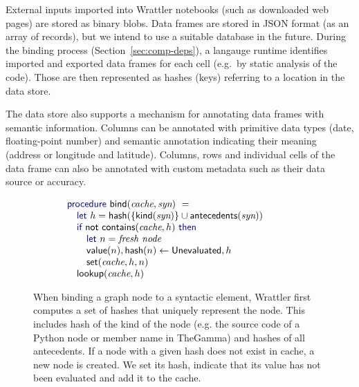 \documentclass[sigplan]{acmart}\settopmatter{printfolios=true,printccs=false,printacmref=false}
\begin{document}
External inputs imported into Wrattler notebooks (such as downloaded web pages) are stored as 
binary blobs. Data frames are stored in JSON format (as an array of records),
but we intend to use a suitable database in the future. During the binding process 
(Section~\ref{sec:comp-deps}), a langauge runtime identifies imported and exported data frames 
for each cell (e.g.~by static analysis of the code). Those are then represented as hashes (keys)
referring to a location in the data store.

The data store also supports a mechanism for annotating data frames with 
semantic information. Columns can be annotated with primitive data types (date, floating-point 
number) and semantic annotation indicating their meaning (address or longitude and latitude). 
Columns, rows and individual cells of the data frame can also be annotated with custom metadata 
such as their data source or accuracy.

\begin{figure}
\vspace{-1em}
\begin{equation*}
\hspace{-3em}\begin{array}{l}
\kvd{procedure}~\ident{bind}(\textit{cache}, \textit{syn})~=\\
\quad \kvd{let}~h = \ident{hash}(\{\ident{kind}(\textit{syn}) \}\cup \ident{antecedents}(\textit{syn}))\\
\quad \kvd{if}~\ident{not}~\ident{contains}(\textit{cache}, h)~\kvd{then}\\
\quad \quad \kvd{let}~n = \emph{fresh node}\\
\quad \quad \ident{value}(n), \ident{hash}(n) \leftarrow \ident{Unevaluated}, h \\
\quad \quad \ident{set}(\textit{cache}, h, n) \\
\quad \ident{lookup}(\textit{cache}, h)\\
\end{array}
\end{equation*}
\vspace{-0.5em}
\caption{\small{When binding a graph node to a syntactic element, Wrattler first computes
  a set of hashes that uniquely represent the node. This includes hash of the kind of the 
  node (e.g. the source code of a Python node or member name in TheGamma) and hashes
  of all antecedents. If a node with a given hash does not exist in cache, a new node
  is created. We set its hash, indicate that its value has not been evaluated and
  add it to the cache.}}
\label{fig:bind}
\vspace{-1em}
\end{figure}
\end{document}
